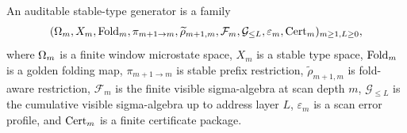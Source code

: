\begin{definition}
\label{def:main-output-object}
An auditable stable-type generator is a family
\[
(\Omega_m,X_m,\operatorname{Fold}_m,\pi_{m+1\to m},\widetilde\rho_{m+1,m},\mathcal F_m,\mathcal G_{\le L},\varepsilon_m,\operatorname{Cert}_m)_{m\ge1,L\ge0},
\]
where \(\Omega_m\) is a finite window microstate space, \(X_m\) is a stable type space, \(\operatorname{Fold}_m\) is a golden folding map, \(\pi_{m+1\to m}\) is stable prefix restriction, \(\widetilde\rho_{m+1,m}\) is fold-aware restriction, \(\mathcal F_m\) is the finite visible sigma-algebra at scan depth \(m\), \(\mathcal G_{\le L}\) is the cumulative visible sigma-algebra up to address layer \(L\), \(\varepsilon_m\) is a scan error profile, and \(\operatorname{Cert}_m\) is a finite certificate package.
\end{definition}
